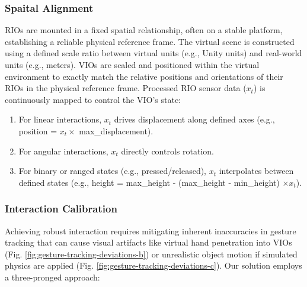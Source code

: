 \subsubsection{Spaital Alignment}
RIOs are mounted in a fixed spatial relationship, often on a stable platform, establishing a reliable physical reference frame. The virtual scene is constructed using a defined scale ratio between virtual units (e.g., Unity units) and real-world units (e.g., meters). VIOs are scaled and positioned within the virtual environment to exactly match the relative positions and orientations of their RIOs in the physical reference frame. Processed RIO sensor data ($x_t$) is continuously mapped to control the VIO's state:
\begin{enumerate}
  \item For linear interactions, $x_t$ drives displacement along defined axes (e.g., position = $x_t \times$ max\_displacement).

  \item For angular interactions, $x_t$ directly controls rotation.

  \item For binary or ranged states (e.g., pressed/released), $x_t$ interpolates between defined states (e.g., height = max\_height - (max\_height - min\_height) $\times x_t$).
\end{enumerate}


\subsubsection{Interaction Calibration}
Achieving robust interaction requires mitigating inherent inaccuracies in gesture tracking that can cause visual artifacts like virtual hand penetration into VIOs (Fig. \ref{fig:gesture-tracking-deviations-b}) or unrealistic object motion if simulated physics are applied (Fig. \ref{fig:gesture-tracking-deviations-c}). Our solution employs a three-pronged approach:

